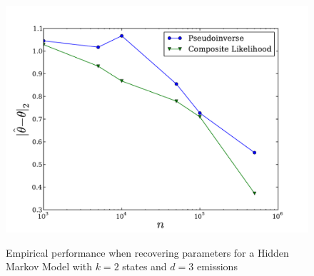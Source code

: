 \begin{figure}
  \centering
  \includegraphics[width=0.8\columnwidth]{figures/hmm-2-3.pdf}
    \label{fig:cl-hmm}
  \caption{Empirical performance when recovering parameters for a Hidden Markov Model with $k=2$ states and $d=3$ emissions}
\end{figure}
